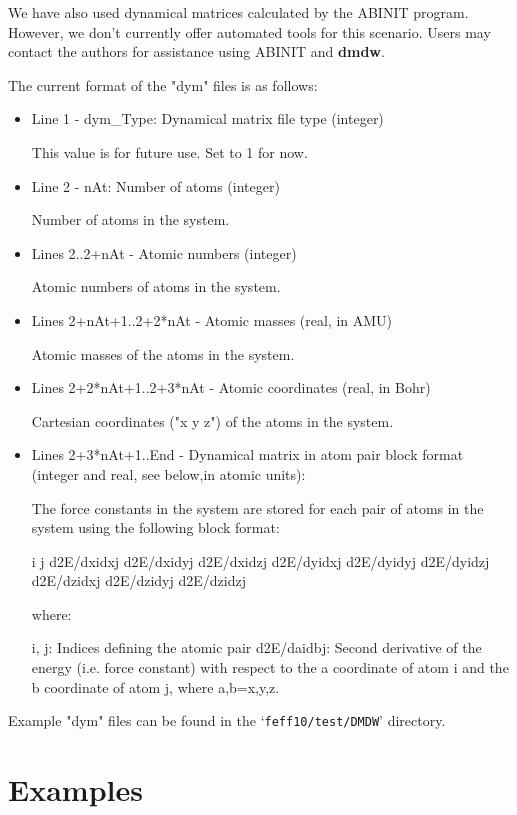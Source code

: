 \documentclass[11pt,oneside]{report} %
\newcommand{\file}[1]{`\texttt{#1}'}
\newcommand{\module}[1]{\textrm{\bf{#1}}}
\begin{document}
\begin{latexonly}
  We have also used dynamical matrices calculated by the ABINIT program.  However, we don't currently offer
  automated tools for this scenario.  Users may contact the authors for assistance using ABINIT and \module{dmdw}.
  
  The current format of the "dym" files is as follows:
\begin{itemize}
\item Line 1 - dym\_Type: Dynamical matrix file type (integer)

  This value is for future use. Set to 1 for now.

\item Line 2 - nAt: Number of atoms (integer)

  Number of atoms in the system.
  
\item Lines 2..2+nAt - Atomic numbers (integer)

  Atomic numbers of atoms in the system.

\item Lines 2+nAt+1..2+2*nAt - Atomic masses (real, in AMU)

  Atomic masses of the atoms in the system.

\item Lines 2+2*nAt+1..2+3*nAt - Atomic coordinates (real, in Bohr)

  Cartesian coordinates ("x y z") of the atoms in the system.

\item Lines 2+3*nAt+1..End - Dynamical matrix in atom pair block format (integer and
                       real, see below,in atomic units):

  The force constants in the system are stored for each pair of atoms in the
  system using the following block format:

     i j
     d2E/dxidxj d2E/dxidyj d2E/dxidzj
     d2E/dyidxj d2E/dyidyj d2E/dyidzj
     d2E/dzidxj d2E/dzidyj d2E/dzidzj

  where:
  
     i, j: Indices defining the atomic pair
     d2E/daidbj: Second derivative of the energy (i.e. force constant) with
                 respect to the a coordinate of atom i and the b coordinate of
		 atom j, where a,b={x,y,z}.
\end{itemize}

Example "dym" files can be found in the \file{feff10/test/DMDW} directory.


\section{Examples}
\label{sec:Append-G-DMDW-Example}


\end{latexonly}
\end{document}
